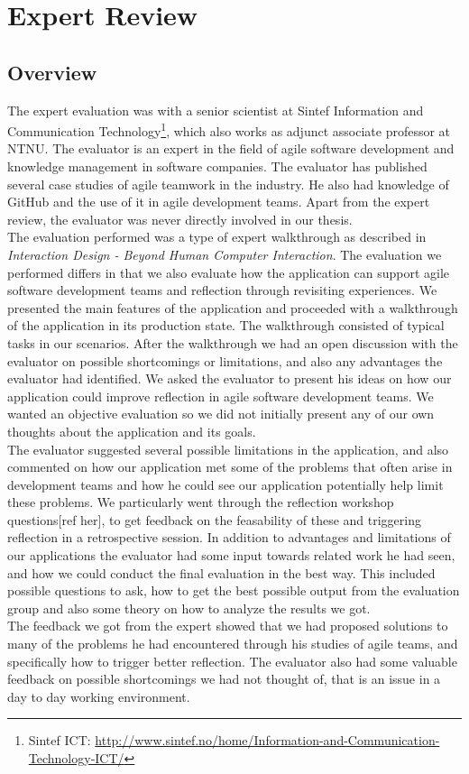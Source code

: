 \chapter{Expert Review}
\section{Overview}
The expert evaluation was with a senior scientist at Sintef Information and Communication Technology\footnote{Sintef ICT: \url{http://www.sintef.no/home/Information-and-Communication-Technology-ICT/}}, which also works as adjunct associate professor at NTNU. The evaluator is an expert in the field of agile software development and knowledge management in software companies. The evaluator has published several case studies of agile teamwork in the industry. He also had knowledge of GitHub and the use of it in agile development teams.  Apart from the expert review, the evaluator was never directly involved in our thesis.  \\
The evaluation performed was a type of expert walkthrough as described in \emph{Interaction Design - Beyond Human Computer Interaction}\cite{rogers2011interaction}. The evaluation we performed differs in that we also evaluate how the application can support agile software development teams and reflection through revisiting experiences. We presented the main features of the application and proceeded with a walkthrough of the application in its production state. The walkthrough consisted of typical tasks in our scenarios. After the walkthrough we had an open discussion with the evaluator on possible shortcomings or limitations, and also any advantages the evaluator had identified. We asked the evaluator to present his ideas on how our application could improve reflection in agile software development teams. We wanted an objective evaluation so we did not initially present any of our own thoughts about the application and its goals. \\
The evaluator suggested several possible limitations in the application, and also commented on how our application met some of the problems that often arise in development teams and how he could see our application potentially help limit these problems. We particularly went through the reflection workshop questions[ref her], to get feedback on the feasability of these and triggering reflection in a retrospective session. 
In addition to advantages and limitations of our applications the evaluator had some input towards related work he had seen, and how we could conduct the final evaluation in the best way. This included possible questions to ask, how to get the best possible output from the evaluation group and also some theory on how to analyze the results we got. \\
The feedback we got from the expert showed that we had proposed solutions to many of the problems he had encountered through his studies of agile teams, and specifically how to trigger better reflection. The evaluator also had some valuable feedback on possible shortcomings we had not thought of, that is an issue in a day to day working environment. 

